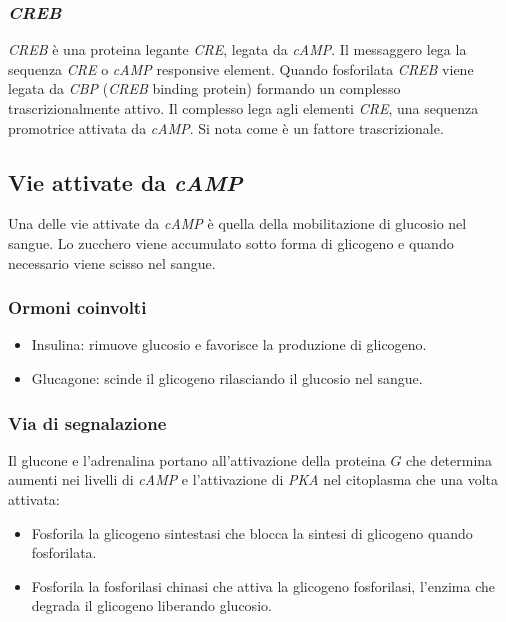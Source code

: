 		\subsubsection{\emph{CREB}}
		\emph{CREB} \`e una proteina legante \emph{CRE}, legata da \emph{cAMP}.
		Il messaggero lega la sequenza \emph{CRE} o \emph{cAMP} responsive element.
		Quando fosforilata \emph{CREB} viene legata da \emph{CBP} (\emph{CREB} binding protein) formando un complesso trascrizionalmente attivo.
		Il complesso lega agli elementi \emph{CRE}, una sequenza promotrice attivata da \emph{cAMP}.
		Si nota come \`e un fattore trascrizionale.

	\subsection{Vie attivate da \emph{cAMP}}
	Una delle vie attivate da \emph{cAMP} \`e quella della mobilitazione di glucosio nel sangue.
	Lo zucchero viene accumulato sotto forma di glicogeno e quando necessario viene scisso nel sangue.

		\subsubsection{Ormoni coinvolti}
		\begin{multicols}{2}
			\begin{itemize}
				\item Insulina: rimuove glucosio e favorisce la produzione di glicogeno.
				\item Glucagone: scinde il glicogeno rilasciando il glucosio nel sangue.
			\end{itemize}
		\end{multicols}

		\subsubsection{Via di segnalazione}
		Il glucone e l'adrenalina portano all'attivazione della proteina $G$ che determina aumenti nei livelli di \emph{cAMP} e l'attivazione di \emph{PKA} nel citoplasma che una volta attivata:
		\begin{multicols}{2}
			\begin{itemize}
				\item Fosforila la glicogeno sintestasi che blocca la sintesi di glicogeno quando fosforilata.
				\item Fosforila la fosforilasi chinasi che attiva la glicogeno fosforilasi, l'enzima che degrada il glicogeno liberando glucosio.
			\end{itemize}
		\end{multicols}

